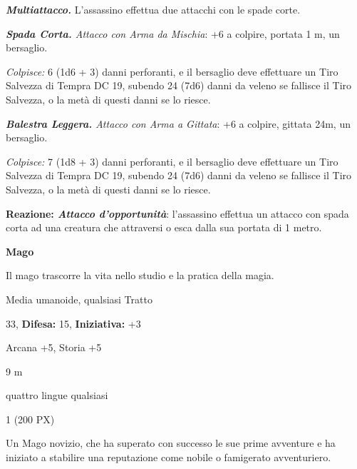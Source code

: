 \begin{multicols}{2}
{\emph{\textbf{Multiattacco.}} L'assassino effettua due attacchi con le spade corte.

\emph{\textbf{Spada Corta.} Attacco con Arma da Mischia}: +6 a colpire, portata 1 m, un bersaglio.

\emph{Colpisce:} 6 (1d6 + 3) danni perforanti, e il bersaglio deve effettuare un Tiro Salvezza di Tempra DC 19, subendo 24 (7d6) danni da veleno se fallisce il Tiro Salvezza, o la metà di questi danni se lo riesce.

\emph{\textbf{Balestra Leggera.} Attacco con Arma a Gittata}: +6 a colpire, gittata 24m, un bersaglio.

\emph{Colpisce:} 7 (1d8 + 3) danni perforanti, e il bersaglio deve effettuare un Tiro Salvezza di Tempra DC 19, subendo 24 (7d6) danni da veleno se fallisce il Tiro Salvezza, o la metà di questi danni se lo riesce.

\textbf{Reazione: \emph{Attacco d'opportunità}}: l'assassino effettua un attacco con spada corta ad una creatura che attraversi o esca dalla sua portata di 1 metro.

\medskip\textbf{Mago}

Il mago trascorre la vita nello studio e la pratica della magia.

\begin{description}[noitemsep, topsep=0pt, parsep=0pt, partopsep=0pt, leftmargin=0cm, labelwidth=2.2cm]
    \item[\textbf{Taglia/Tipo:}] Media umanoide, qualsiasi Tratto
    \item[\textbf{Caratt.:}] 
    \item[\textbf{Punti Ferita:}] 33,  \textbf{Difesa:} 15,  \textbf{Iniziativa:} +3
    \item[\textbf{Comp.:}] Arcana +5, Storia +5
    \item[\textbf{Tiri Salvez.:}] 
    \item[\textbf{Movimento:}] 9 m
    \item[\textbf{Linguaggi:}] quattro lingue qualsiasi
    \item[\textbf{Sfida:}] 1 (200 PX)\smallskip
\end{description}

Un Mago novizio, che ha superato con successo le sue prime avventure e ha iniziato a stabilire una reputazione come nobile o famigerato avventuriero.

}
\end{multicols}
